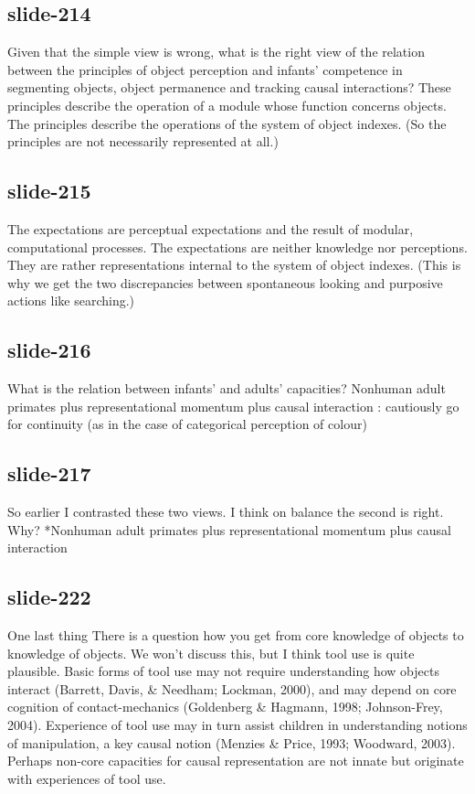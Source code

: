 \documentclass[12pt,\papersize]{extarticle}
\begin{document}
 
\subsection{slide-214}
Given that the simple view is wrong, what is the right view of the relation between the principles of object perception and infants' competence in segmenting objects, object permanence and tracking causal interactions?
These principles describe the operation of a module whose function concerns objects.
The principles describe the operations of the system of object indexes.
(So the principles are not necessarily represented at all.)
 
 
\subsection{slide-215}
The expectations are perceptual expectations and the result of modular, computational processes.
The expectations are neither knowledge nor perceptions.
They are rather representations internal to the system of object indexes.
(This is why we get the two discrepancies between spontaneous looking and purposive actions like searching.)
 
 
\subsection{slide-216}
What is the relation between infants' and adults' capacities? Nonhuman adult primates plus representational momentum plus causal interaction : cautiously go for continuity (as in the case of categorical perception of colour)
 
 
\subsection{slide-217}
So earlier I contrasted these two views.
I think on balance the second is right.
Why? *Nonhuman adult primates plus representational momentum plus causal interaction
 
 
\subsection{slide-222}
One last thing
There is a question how you get from core knowledge of objects to knowledge of objects.
We won't discuss this, but I think tool use is quite plausible.
Basic forms of tool use may not require understanding how objects interact (Barrett, Davis, \& Needham; Lockman, 2000), and may depend on core cognition of contact-mechanics (Goldenberg \& Hagmann, 1998; Johnson-Frey, 2004). Experience of tool use may in turn assist children in understanding notions of manipulation, a key causal notion (Menzies \& Price, 1993; Woodward, 2003). Perhaps non-core capacities for causal representation are not innate but originate with experiences of tool use.


 






\end{document}
